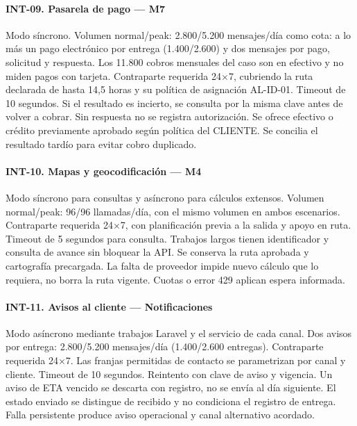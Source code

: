 \paragraph{INT-09. Pasarela de pago — M7}
Modo síncrono. Volumen normal/peak: 2.800/5.200 mensajes/día como cota: a lo más un pago electrónico por entrega (1.400/2.600) y dos mensajes por pago, solicitud y respuesta. Los 11.800 cobros mensuales del caso son en efectivo y no miden pagos con tarjeta. Contraparte requerida 24$\times$7, cubriendo la ruta declarada de hasta 14,5 horas y su política de asignación AL-ID-01. Timeout de 10 segundos. Si el resultado es incierto, se consulta por la misma clave antes de volver a cobrar. Sin respuesta no se registra autorización. Se ofrece efectivo o crédito previamente aprobado según política del CLIENTE. Se concilia el resultado tardío para evitar cobro duplicado.

\paragraph{INT-10. Mapas y geocodificación — M4}
Modo síncrono para consultas y asíncrono para cálculos extensos. Volumen normal/peak: 96/96 llamadas/día, con el mismo volumen en ambos escenarios. Contraparte requerida 24$\times$7, con planificación previa a la salida y apoyo en ruta. Timeout de 5 segundos para consulta. Trabajos largos tienen identificador y consulta de avance sin bloquear la API. Se conserva la ruta aprobada y cartografía precargada. La falta de proveedor impide nuevo cálculo que lo requiera, no borra la ruta vigente. Cuotas o error 429 aplican espera informada.

\paragraph{INT-11. Avisos al cliente — Notificaciones}
Modo asíncrono mediante trabajos Laravel y el servicio de cada canal. Dos avisos por entrega: 2.800/5.200 mensajes/día (1.400/2.600 entregas). Contraparte requerida 24×7. Las franjas permitidas de contacto se parametrizan por canal y cliente. Timeout de 10 segundos. Reintento con clave de aviso y vigencia. Un aviso de ETA vencido se descarta con registro, no se envía al día siguiente. El estado enviado se distingue de recibido y no condiciona el registro de entrega. Falla persistente produce aviso operacional y canal alternativo acordado.

